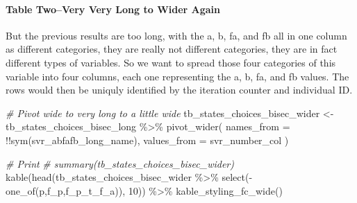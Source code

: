 \documentclass[
]{book}
\newenvironment{Shaded}{\begin{snugshade}}{\end{snugshade}}
\newcommand{\AttributeTok}[1]{\textcolor[rgb]{0.77,0.63,0.00}{#1}}
\newcommand{\CommentTok}[1]{\textcolor[rgb]{0.56,0.35,0.01}{\textit{#1}}}
\newcommand{\DecValTok}[1]{\textcolor[rgb]{0.00,0.00,0.81}{#1}}
\newcommand{\FunctionTok}[1]{\textcolor[rgb]{0.00,0.00,0.00}{#1}}
\newcommand{\NormalTok}[1]{#1}
\newcommand{\OtherTok}[1]{\textcolor[rgb]{0.56,0.35,0.01}{#1}}
\newcommand{\SpecialCharTok}[1]{\textcolor[rgb]{0.00,0.00,0.00}{#1}}
\newcommand{\StringTok}[1]{\textcolor[rgb]{0.31,0.60,0.02}{#1}}
\begin{document}
\hypertarget{table-twovery-very-long-to-wider-again}{%
\paragraph{Table Two--Very Very Long to Wider Again}\label{table-twovery-very-long-to-wider-again}}

But the previous results are too long, with the a, b, fa, and fb all in one column as different categories, they are really not different categories, they are in fact different types of variables. So we want to spread those four categories of this variable into four columns, each one representing the a, b, fa, and fb values. The rows would then be uniquly identified by the iteration counter and individual ID.

\begin{Shaded}
\begin{Highlighting}[]
\CommentTok{\# Pivot wide to very long to a little wide}
\NormalTok{tb\_states\_choices\_bisec\_wider }\OtherTok{\textless{}{-}}\NormalTok{ tb\_states\_choices\_bisec\_long }\SpecialCharTok{\%\textgreater{}\%}
  \FunctionTok{pivot\_wider}\NormalTok{(}
    \AttributeTok{names\_from =} \SpecialCharTok{!!}\FunctionTok{sym}\NormalTok{(svr\_abfafb\_long\_name),}
    \AttributeTok{values\_from =}\NormalTok{ svr\_number\_col}
\NormalTok{  )}

\CommentTok{\# Print}
\CommentTok{\# summary(tb\_states\_choices\_bisec\_wider)}
\FunctionTok{kable}\NormalTok{(}\FunctionTok{head}\NormalTok{(tb\_states\_choices\_bisec\_wider }\SpecialCharTok{\%\textgreater{}\%} 
              \FunctionTok{select}\NormalTok{(}\SpecialCharTok{{-}}\FunctionTok{one\_of}\NormalTok{(}\StringTok{\textquotesingle{}p\textquotesingle{}}\NormalTok{,}\StringTok{\textquotesingle{}f\_p\textquotesingle{}}\NormalTok{,}\StringTok{\textquotesingle{}f\_p\_t\_f\_a\textquotesingle{}}\NormalTok{)), }\DecValTok{10}\NormalTok{)) }\SpecialCharTok{\%\textgreater{}\%} 
  \FunctionTok{kable\_styling\_fc\_wide}\NormalTok{()}
\end{Highlighting}
\end{Shaded}
\end{document}
